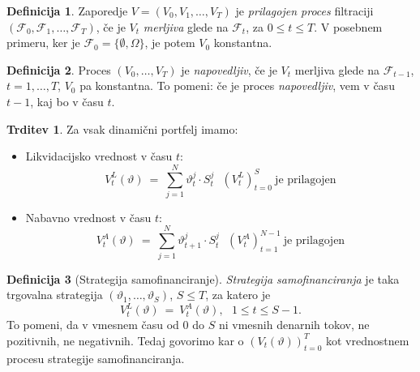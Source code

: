 \documentclass[11pt]{article}
\newcommand{\F}{\mathcal{F}}
\newcommand{\1}{\mathbbm{1}}
\theoremstyle{definition}
\newtheorem{definicija}{Definicija}[section]
\theoremstyle{definition}
\newtheorem{trditev}{Trditev}[section]
\begin{document}
\begin{definicija}

Zaporedje $V = (V_0, V_1,\ldots, V_T)$ je \textit{prilagojen proces} filtraciji $(\F_0, \F_1,\ldots, \F_T)$, če je $V_t$ \textit{merljiva} glede na $\F_t$, za $0 \leq t \leq T$. V posebnem primeru, ker je $\F_0 = \{\emptyset, \Omega\}$, je potem $V_0$ konstantna.

\end{definicija}
\vspace{0.5cm}

\begin{definicija}

Proces $(V_0,\ldots, V_T)$ je \textit{napovedljiv}, če je $V_t$ merljiva glede na $\F_{t-1}$, $t=1,\ldots, T$, $V_0$ pa konstantna. To pomeni: če je proces \textit{napovedljiv}, vem v času $t-1$, kaj bo v času $t$.

\end{definicija}
\vspace{0.5cm}

\begin{trditev}

Za vsak dinamični portfelj imamo:
\begin{itemize}

	\item Likvidacijsko vrednost v času $t$:
	$$V_t^L(\vartheta) ~=~ \sum_{j=1}^N \vartheta_t^j \cdot S_t^j ~~~(V_t^L)_{t=0}^S ~\text{je prilagojen}$$
	
	\item Nabavno vrednost v času $t$:
	$$V_t^A(\vartheta) ~=~ \sum_{j=1}^N \vartheta_{t+1}^j \cdot S_t^j ~~~(V_t^A)_{t=1}^{N-1} ~\text{je prilagojen}$$

\end{itemize}

\end{trditev}
\vspace{0.5cm}

\begin{definicija}[Strategija samofinanciranje]

\textit{Strategija samofinanciranja} je taka trgovalna strategija $(\vartheta_1, \ldots, \vartheta_S)$, $S \leq T$, za katero je 
$$V_t^L(\vartheta) ~=~ V_t^A(\vartheta), ~~~ 1 \leq t \leq S-1.$$
To pomeni, da v vmesnem času od $0$ do $S$ ni vmesnih denarnih tokov, ne pozitivnih, ne negativnih. Tedaj govorimo kar o $(V_t(\vartheta))_{t=0}^T$ kot vrednostnem procesu strategije samofinanciranja.

\end{definicija}
\vspace{0.5cm}
\end{document}
